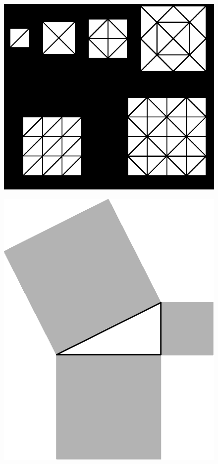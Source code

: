 \begin{figure}[H]
\centering
\includegraphics[scale=.9]{figure/fig_26.eps}
\caption{}\label{chap6-fig26}
\end{figure}

\begin{figure}[H]
\centering
\includegraphics[scale=.9]{figure/fig_27.eps}
\caption{}\label{chap6-fig27}
\end{figure}

